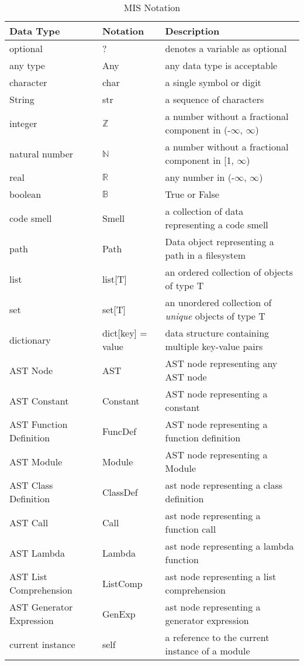 \documentclass[12pt, titlepage]{article}
\begin{document}
\begin{table}
  \centering
  \renewcommand{\arraystretch}{1.2}
  \noindent 
  \begin{tabular}{l l p{7.5cm}} 
    \toprule 
    \textbf{Data Type} & \textbf{Notation} & \textbf{Description}\\ 
    \midrule
    optional & ? & denotes a variable as optional\\
    any type & Any & any data type is acceptable\\
    character & char & a single symbol or digit\\
    String & str & a sequence of characters\\
    integer & $\mathbb{Z}$ & a number without a fractional component in (-$\infty$, $\infty$) \\
    natural number & $\mathbb{N}$ & a number without a fractional component in [1, $\infty$) \\
    real & $\mathbb{R}$ & any number in (-$\infty$, $\infty$)\\
    boolean & $\mathbb{B}$ & True or False\\
    code smell & Smell & a collection of data representing a code smell\\
    path & Path & Data object representing a path in a filesystem\\
    list & list[T] & an ordered collection of objects of type T\\
    set & set[T] & an unordered collection of \textit{unique} objects of type T\\
    dictionary & dict[key] = value & data structure containing multiple key-value pairs\\
    AST Node & AST & AST node representing any AST node\\
    AST Constant & Constant & AST node representing a constant\\
    AST Function Definition & FuncDef & AST node representing a function definition\\
    AST Module & Module & AST node representing a Module\\
    AST Class Definition & ClassDef & ast node representing a class definition\\
    AST Call & Call & ast node representing a function call\\
    AST Lambda & Lambda & ast node representing a lambda function\\
    AST List Comprehension & ListComp & ast node representing a list comprehension\\
    AST Generator Expression & GenExp & ast node representing a generator expression\\
    current instance & self & a reference to the current instance of a module\\
    \bottomrule
  \end{tabular}
  \label{tab:mis-notation}
  \caption{MIS Notation}
\end{table}
\end{document}
